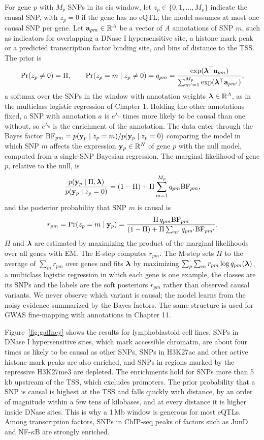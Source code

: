 For gene $p$ with $M_p$ SNPs in its cis window, let $z_p\in\{0,1,\dots,M_p\}$ indicate the causal SNP, with $z_p=0$ if the gene has no eQTL; the model assumes at most one causal SNP per gene. Let $\mathbf{a}_{pm}\in\mathbb{R}^A$ be a vector of $A$ annotations of SNP $m$, such as indicators for overlapping a DNase I hypersensitive site, a histone mark peak or a predicted transcription factor binding site, and bins of distance to the TSS. The prior is
\begin{equation}
  \Pr(z_p\neq0) = \Pi, \qquad \Pr(z_p=m\mid z_p\neq0) = q_{pm} = \frac{\exp(\boldsymbol{\lambda}^\top\mathbf{a}_{pm})}{\sum_{m'=1}^{M_p}\exp(\boldsymbol{\lambda}^\top\mathbf{a}_{pm'})},
\end{equation}
a softmax over the SNPs in the window with annotation weights $\boldsymbol{\lambda}\in\mathbb{R}^A$, as in the multiclass logistic regression of Chapter 1. Holding the other annotations fixed, a SNP with annotation $a$ is $e^{\lambda_a}$ times more likely to be causal than one without, so $e^{\lambda_a}$ is the enrichment of the annotation. The data enter through the Bayes factor $\text{BF}_{pm}=p(\mathbf{y}_p\mid z_p=m)/p(\mathbf{y}_p\mid z_p=0)$ comparing the model in which SNP $m$ affects the expression $\mathbf{y}_p\in\mathbb{R}^N$ of gene $p$ with the null model, computed from a single-SNP Bayesian regression. The marginal likelihood of gene $p$, relative to the null, is
\begin{equation}
  \frac{p(\mathbf{y}_p\mid\Pi,\boldsymbol{\lambda})}{p(\mathbf{y}_p\mid z_p=0)} = (1-\Pi) + \Pi\sum_{m=1}^{M_p}q_{pm}\text{BF}_{pm},
\end{equation}
and the posterior probability that SNP $m$ is causal is
\begin{equation}
  r_{pm} = \Pr(z_p=m\mid\mathbf{y}_p) = \frac{\Pi\,q_{pm}\text{BF}_{pm}}{(1-\Pi)+\Pi\sum_{m'}q_{pm'}\text{BF}_{pm'}}.
\end{equation}
$\Pi$ and $\boldsymbol{\lambda}$ are estimated by maximizing the product of the marginal likelihoods over all genes with EM. The E-step computes $r_{pm}$. The M-step sets $\Pi$ to the average of $\sum_m r_{pm}$ over genes and fits $\boldsymbol{\lambda}$ by maximizing $\sum_p\sum_m r_{pm}\log q_{pm}(\boldsymbol{\lambda})$, a multiclass logistic regression in which each gene is one example, the classes are its SNPs and the labels are the soft posteriors $r_{pm}$ rather than observed causal variants. We never observe which variant is causal; the model learns from the noisy evidence summarized by the Bayes factors. The same structure is used for GWAS fine-mapping with annotations in Chapter 11.

Figure~\ref{fig:gaffney} shows the results for lymphoblastoid cell lines. SNPs in DNase I hypersensitive sites, which mark accessible chromatin, are about four times as likely to be causal as other SNPs, SNPs in H3K27ac and other active histone mark peaks are also enriched, and SNPs in regions marked by the repressive H3K27me3 are depleted. The enrichments hold for SNPs more than 5\,kb upstream of the TSS, which excludes promoters. The prior probability that a SNP is causal is highest at the TSS and falls quickly with distance, by an order of magnitude within a few tens of kilobases, and at every distance it is higher inside DNase sites. This is why a 1\,Mb window is generous for most eQTLs. Among transcription factors, SNPs in ChIP-seq peaks of factors such as JunD and NF-$\kappa$B are strongly enriched.

